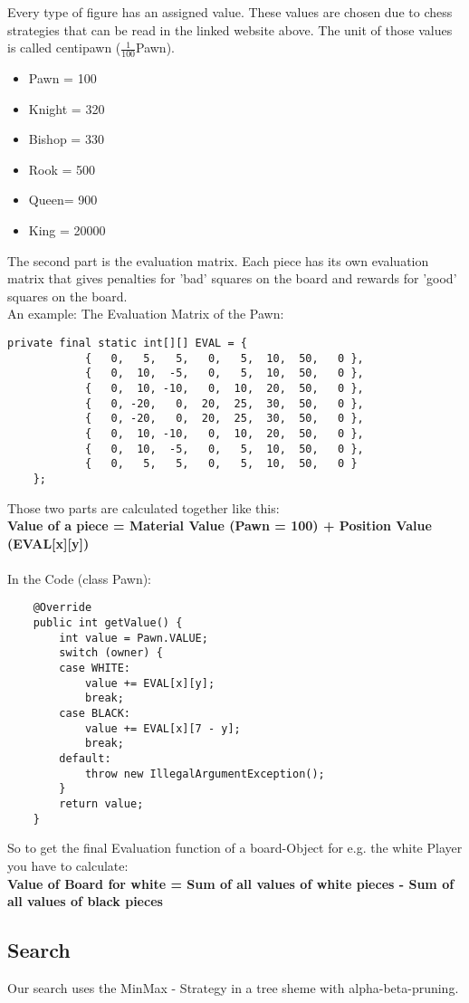 \documentclass[final, paper=a4, paper=portrait, pagesize=auto, fontsize=10pt,english]{scrartcl}
\begin{document}
Every type of figure has an assigned value. These values are chosen due to chess strategies that can be read in the linked website above. The unit of those values is called centipawn (\( \frac{1}{100} \)Pawn).
\begin{itemize}
\item Pawn = 100
\item Knight = 320
\item Bishop = 330
\item Rook = 500
\item Queen= 900
\item King = 20000
\end{itemize}
The second part is the evaluation matrix. Each piece has its own evaluation matrix that gives penalties for 'bad' squares on the board and rewards for 'good' squares on the board. \\
An example: The Evaluation Matrix of the Pawn:
\begin{lstlisting}
private final static int[][] EVAL = {
			{   0,   5,   5,   0,   5,  10,  50,   0 },
			{   0,  10,  -5,   0,   5,  10,  50,   0 },
			{   0,  10, -10,   0,  10,  20,  50,   0 },
			{   0, -20,   0,  20,  25,  30,  50,   0 },
			{   0, -20,   0,  20,  25,  30,  50,   0 },
			{   0,  10, -10,   0,  10,  20,  50,   0 },
			{   0,  10,  -5,   0,   5,  10,  50,   0 },
			{   0,   5,   5,   0,   5,  10,  50,   0 }
	};
\end{lstlisting}
Those two parts are calculated together like this: \\
\textbf{Value of a piece = Material Value (Pawn = 100) + Position Value (EVAL[x][y])} \\\\
In the Code (class Pawn):
\begin{lstlisting}
	@Override
	public int getValue() {
		int value = Pawn.VALUE;
		switch (owner) {
		case WHITE:
			value += EVAL[x][y];
			break;
		case BLACK:
			value += EVAL[x][7 - y];
			break;
		default:
			throw new IllegalArgumentException();
		}
		return value;
	}
\end{lstlisting}

So to get the final Evaluation function of a board-Object for e.g. the white Player you have to calculate: \\
\textbf{Value of Board for white = Sum of all values of white pieces - Sum of all values of black pieces}


\subsection{Search}
Our search uses the MinMax - Strategy in a tree sheme with alpha-beta-pruning.
\end{document}
